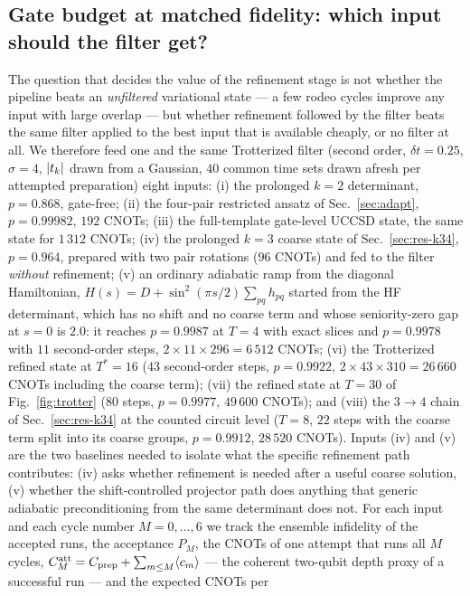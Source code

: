 \documentclass[
  aps,            %
  prc,            %
  reprint,        %
  superscriptaddress,
  floatfix,
  nofootinbib
]{revtex4-2}
\begin{document}
\subsection{Gate budget at matched fidelity: which input should the filter get?}
\label{sec:depth}
The question that decides the value of the refinement stage is not whether the
pipeline beats an \emph{unfiltered} variational state --- a few rodeo cycles
improve any input with large overlap --- but whether refinement followed by
the filter beats the same filter applied to the best input that is available
cheaply, or no filter at all.  We therefore feed one and the same Trotterized
filter (second order, $\delta t=0.25$, $\sigma=4$, $\abs{t_k}$ drawn from a
Gaussian, $40$ common time sets drawn afresh per attempted preparation) eight
inputs: (i) the prolonged $k=2$ determinant, $p=0.868$, gate-free; (ii) the
four-pair restricted ansatz of Sec.~\ref{sec:adapt}, $p=0.99982$, $192$
CNOTs; (iii) the full-template gate-level UCCSD state, the same state for
$1\,312$ CNOTs; (iv) the prolonged $k=3$ coarse state of
Sec.~\ref{sec:res-k34}, $p=0.964$, prepared with two pair rotations ($96$
CNOTs) and fed to the filter \emph{without} refinement; (v) an ordinary
adiabatic ramp from the diagonal Hamiltonian,
$H(s)=D+\sin^2(\pi s/2)\sum_{pq}h_{pq}$ started from the HF determinant,
which has no shift and no coarse term and whose seniority-zero gap at $s=0$
is $2.0$: it reaches $p=0.9987$ at $T=4$ with exact slices and $p=0.9978$
with $11$ second-order steps, $2\times11\times296=6\,512$ CNOTs; (vi) the
Trotterized refined state at $T^{*}=16$ ($43$ second-order steps,
$p=0.9922$, $2\times43\times310=26\,660$ CNOTs including the coarse term);
(vii) the refined state at $T=30$ of Fig.~\ref{fig:trotter} ($80$ steps,
$p=0.9977$, $49\,600$ CNOTs); and (viii) the $3\to4$ chain of
Sec.~\ref{sec:res-k34} at the counted circuit level ($T=8$, $22$ steps with
the coarse term split into its coarse groups, $p=0.9912$, $28\,520$ CNOTs).
Inputs (iv) and (v) are the two baselines needed to isolate what the
specific refinement path contributes: (iv) asks whether refinement is needed
after a useful coarse solution, (v) whether the shift-controlled projector
path does anything that generic adiabatic preconditioning from the same
determinant does not.  For each input and each cycle number $M=0,\ldots,6$
we track the ensemble infidelity of the accepted runs, the acceptance $P_M$,
the CNOTs of one attempt that runs all $M$ cycles,
$C^{\rm att}_M=C_{\rm prep}+\sum_{m\le M}\langle c_m\rangle$ --- the coherent
two-qubit depth proxy of a successful run --- and the expected CNOTs per
\end{document}
